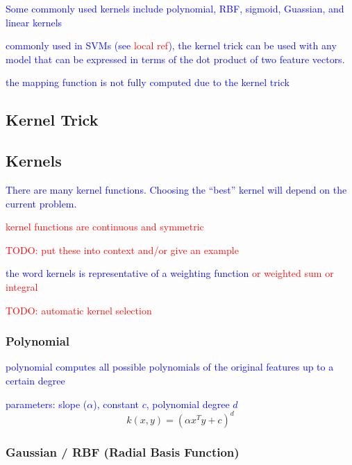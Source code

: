 \textcolor{blue}{Some commonly used kernels include polynomial, RBF, sigmoid, Guassian, and linear kernels}

\textcolor{blue}{commonly used in SVMs (see \textcolor{red}{local ref}), the kernel trick can be used with any model that can be expressed in terms of the dot product of two feature vectors.}

\textcolor{blue}{the mapping function is not fully computed due to the kernel trick}

\subsection{Kernel Trick}

\subsection{Kernels}

\textcolor{blue}{There are many kernel functions. Choosing the ``best'' kernel will depend on the current problem.}

\textcolor{red}{kernel functions are continuous and symmetric}

\textcolor{red}{TODO: put these into context and/or give an example}

\textcolor{blue}{the word kernels is representative of a weighting function \textcolor{red}{or weighted sum or integral}}



\textcolor{red}{TODO: automatic kernel selection}

\subsubsection{Polynomial}

\textcolor{blue}{polynomial computes all possible polynomials of the original features up to a certain degree}

\textcolor{blue}{parameters: slope ($\alpha$), constant $c$, polynomial degree $d$}
\begin{equation}
{k(x, y) = (\alpha x^T y + c)^d}
\label{eq:kernel_polynomial_eq}
\end{equation}

\subsubsection{Gaussian / RBF (Radial Basis Function)}

